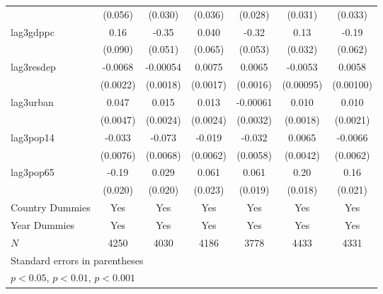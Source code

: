 \begin{table}[htbp]
\begin{tabular}{l*{6}{c}}
            &     (0.056)         &     (0.030)         &     (0.036)         &     (0.028)         &     (0.031)         &     (0.033)         \\
[1em]
lag3gdppc   &        0.16         &       -0.35\sym{***}&       0.040         &       -0.32\sym{***}&        0.13\sym{***}&       -0.19\sym{**} \\
            &     (0.090)         &     (0.051)         &     (0.065)         &     (0.053)         &     (0.032)         &     (0.062)         \\
[1em]
lag3resdep  &     -0.0068\sym{**} &    -0.00054         &      0.0075\sym{***}&      0.0065\sym{***}&     -0.0053\sym{***}&      0.0058\sym{***}\\
            &    (0.0022)         &    (0.0018)         &    (0.0017)         &    (0.0016)         &   (0.00095)         &   (0.00100)         \\
[1em]
lag3urban   &       0.047\sym{***}&       0.015\sym{***}&       0.013\sym{***}&    -0.00061         &       0.010\sym{***}&       0.010\sym{***}\\
            &    (0.0047)         &    (0.0024)         &    (0.0024)         &    (0.0032)         &    (0.0018)         &    (0.0021)         \\
[1em]
lag3pop14   &      -0.033\sym{***}&      -0.073\sym{***}&      -0.019\sym{**} &      -0.032\sym{***}&      0.0065         &     -0.0066         \\
            &    (0.0076)         &    (0.0068)         &    (0.0062)         &    (0.0058)         &    (0.0042)         &    (0.0062)         \\
[1em]
lag3pop65   &       -0.19\sym{***}&       0.029         &       0.061\sym{**} &       0.061\sym{**} &        0.20\sym{***}&        0.16\sym{***}\\
            &     (0.020)         &     (0.020)         &     (0.023)         &     (0.019)         &     (0.018)         &     (0.021)         \\
[1em]
Country Dummies &         Yes         &         Yes         &         Yes         &         Yes         &         Yes         &         Yes         \\
[1em]
Year Dummies &         Yes         &         Yes         &         Yes         &         Yes         &         Yes         &         Yes         \\
\hline
\(N\)       &        4250         &        4030         &        4186         &        3778         &        4433         &        4331         \\
\hline\hline
\multicolumn{7}{l}{\footnotesize Standard errors in parentheses}\\
\multicolumn{7}{l}{\footnotesize \sym{*} \(p<0.05\), \sym{**} \(p<0.01\), \sym{***} \(p<0.001\)}\\
\end{tabular}
\end{table}
